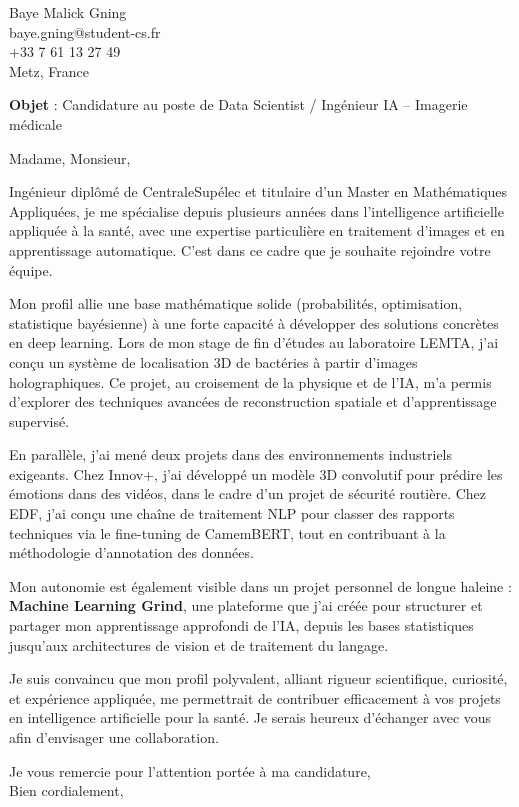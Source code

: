 
\begin{flushright}
Baye Malick Gning\\
baye.gning@student-cs.fr\\
+33 7 61 13 27 49\\
Metz, France
\end{flushright}

\vspace{1cm}

\noindent
\textbf{Objet} : Candidature au poste de Data Scientist / Ingénieur IA – Imagerie médicale

\vspace{0.5cm}

Madame, Monsieur,

Ingénieur diplômé de CentraleSupélec et titulaire d’un Master en Mathématiques Appliquées, je me spécialise depuis plusieurs années dans l’intelligence artificielle appliquée à la santé, avec une expertise particulière en traitement d’images et en apprentissage automatique. C’est dans ce cadre que je souhaite rejoindre votre équipe.

Mon profil allie une base mathématique solide (probabilités, optimisation, statistique bayésienne) à une forte capacité à développer des solutions concrètes en deep learning. Lors de mon stage de fin d’études au laboratoire LEMTA, j’ai conçu un système de localisation 3D de bactéries à partir d’images holographiques. Ce projet, au croisement de la physique et de l’IA, m’a permis d’explorer des techniques avancées de reconstruction spatiale et d’apprentissage supervisé.

En parallèle, j’ai mené deux projets dans des environnements industriels exigeants. Chez Innov+, j’ai développé un modèle 3D convolutif pour prédire les émotions dans des vidéos, dans le cadre d’un projet de sécurité routière. Chez EDF, j’ai conçu une chaîne de traitement NLP pour classer des rapports techniques via le fine-tuning de CamemBERT, tout en contribuant à la méthodologie d’annotation des données.

Mon autonomie est également visible dans un projet personnel de longue haleine : \textbf{Machine Learning Grind}, une plateforme que j’ai créée pour structurer et partager mon apprentissage approfondi de l’IA, depuis les bases statistiques jusqu’aux architectures de vision et de traitement du langage.

Je suis convaincu que mon profil polyvalent, alliant rigueur scientifique, curiosité, et expérience appliquée, me permettrait de contribuer efficacement à vos projets en intelligence artificielle pour la santé. Je serais heureux d’échanger avec vous afin d'envisager une collaboration.

Je vous remercie pour l’attention portée à ma candidature,\\
Bien cordialement,
